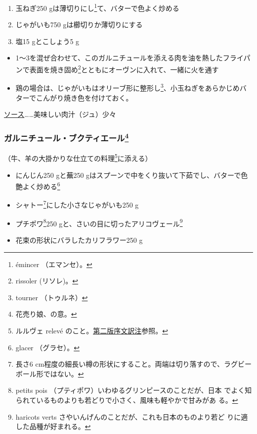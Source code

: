 \begin{recette}
\begin{enumerate}
\def\labelenumi{\arabic{enumi}.}
\item
  玉ねぎ250 gは薄切りにし\footnote{émincer （エマンセ）。}て、バターで色よく炒める
\item
  じゃがいも750 gは櫛切りか薄切りにする
\item
  塩15 gとこしょう5 g
\end{enumerate}

\begin{itemize}
\item
  1〜3を混ぜ合わせて、このガルニチュールを添える肉を油を熱したフライパンで表面を焼き固め\footnote{rissoler
    (リソレ)。}とともにオーヴンに入れて、一緒に火を通す
\item
  鶏の場合は、じゃがいもはオリーブ形に整形し\footnote{tourner
    （トゥルネ）}、小玉ねぎをあらかじめバターでこんがり焼き色を付けておく。
\end{itemize}

\ul{ソース}\ldots{}\ldots{}美味しい肉汁（ジュ）少々

\hypertarget{garniture-bouquetiere}{%
\subsubsection[ガルニチュール・ブクティエール]{\texorpdfstring{ガルニチュール・ブクティエール\footnote{花売り娘、の意。}}{ガルニチュール・ブクティエール}}\label{garniture-bouquetiere}}



（牛、羊の大掛かりな仕立ての料理\footnote{ルルヴェ relevé
  のこと。\protect\hyperlink{releve}{第二版序文訳注}参照。}に添える）

\begin{itemize}
\item
  にんじん250 gと蕪250
  gはスプーンで中をくり抜いて下茹でし、バターで色艶よく炒める\footnote{glacer
    （グラセ）。}
\item
  シャトー\footnote{長さ6
    cm程度の細長い樽の形状にすること。両端は切り落すので、ラグビーボール形ではない。}にした小さなじゃがいも250
  g
\item
  プチポワ\footnote{petits pois
    （プティポワ）いわゆるグリンピースのことだが、日本
    でよく知られているものよりも若どりで小さく、風味も軽やかで甘みがあ
    る。}250 gと、さいの目に切ったアリコヴェール\footnote{haricots verts
    さやいんげんのことだが、これも日本のものより若ど
    りに適した品種が好まれる。}
\item
  花束の形状にバラしたカリフラワー250 g
\end{itemize}


\end{recette}
